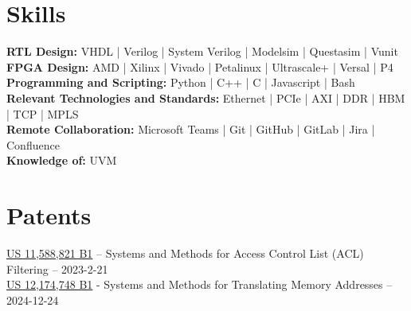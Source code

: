 \documentclass[8pt]{deedy-resume-reversed}
\begin{document}
\begin{minipage}[t]{1.0\textwidth}




\section{Skills}
\textbf{RTL Design:} VHDL | Verilog | System Verilog | Modelsim | Questasim | Vunit \\
\textbf{FPGA Design:} AMD | Xilinx | Vivado | Petalinux | Ultrascale+ | Versal | P4 \\
\textbf{Programming and Scripting:} Python | C++ | C | Javascript | Bash \\
\textbf{Relevant Technologies and Standards:} Ethernet | PCIe | AXI | DDR | HBM | TCP | MPLS \\
\textbf{Remote Collaboration:} Microsoft Teams | Git | GitHub | GitLab | Jira | Confluence \\
\textbf{Knowledge of:} UVM \\
\sectionsep


\section{Patents}
\href{https://image-ppubs.uspto.gov/dirsearch-public/print/downloadPdf/11588821}{US 11,588,821 B1}
– Systems and Methods for Access Control List (ACL) Filtering – 2023-2-21 \\
\href{https://image-ppubs.uspto.gov/dirsearch-public/print/downloadPdf/12174748}{US 12,174,748 B1}
- Systems and Methods for Translating Memory Addresses – 2024-12-24 \\
\sectionsep

\end{minipage}
\end{document}
